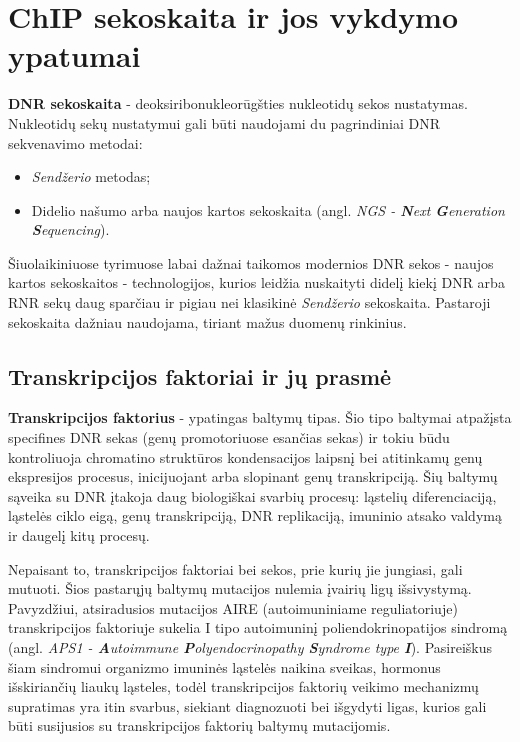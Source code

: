 \documentclass[12pt]{article}
\begin{document}
\section{ChIP sekoskaita ir jos vykdymo ypatumai}

\textbf{DNR sekoskaita} - deoksiribonukleorūgšties nukleotidų sekos nustatymas.
Nukleotidų sekų nustatymui gali būti naudojami du pagrindiniai DNR sekvenavimo 
metodai:

\begin{itemize}
    \item \emph{Sendžerio} metodas;
    \item Didelio našumo arba naujos kartos sekoskaita
    (angl. \emph{NGS - \textbf{N}ext \textbf{G}eneration \textbf{S}equencing}).
\end{itemize}

Šiuolaikiniuose tyrimuose labai dažnai taikomos modernios DNR sekos - naujos 
kartos se\-kos\-kai\-tos - technologijos, kurios leidžia nuskaityti didelį kiekį
DNR arba RNR sekų daug sparčiau ir pigiau nei klasikinė \emph{Sendžerio} 
sekoskaita. Pastaroji sekoskaita dažniau naudojama, tiriant mažus duomenų
rinkinius.

\subsection{Transkripcijos faktoriai ir jų prasmė}

\textbf{Transkripcijos faktorius} - ypatingas baltymų tipas. Šio tipo baltymai
atpažįsta specifines DNR sekas (genų promotoriuose esančias sekas) ir tokiu būdu
kontroliuoja chromatino struktūros kondensacijos laipsnį bei atitinkamų genų
ekspresijos procesus, inicijuojant arba slopinant genų transkripciją. Šių
baltymų sąveika su DNR įtakoja daug biologiškai svarbių procesų: ląstelių
diferenciaciją, ląstelės ciklo eigą, genų transkripciją, DNR replikaciją,
imuninio atsako valdymą ir daugelį kitų procesų\cite{ARTICLE10, ARTICLE11}.

Nepaisant to, transkripcijos faktoriai bei sekos, prie kurių jie jungiasi, gali
mutuoti. Šios pastarųjų baltymų mutacijos nulemia įvairių ligų išsivystymą.
Pavyzdžiui, atsiradusios mutacijos AIRE (autoimuniniame reguliatoriuje)
transkripcijos faktoriuje sukelia I tipo autoimuninį poliendokrinopatijos
sindromą\cite{ARTICLE9} (angl. \emph{APS1 - \textbf{A}utoimmune
\textbf{P}olyendocrinopathy \textbf{S}yndrome type \textbf{I}}). Pasireiškus
šiam sindromui organizmo imuninės ląstelės naikina sveikas, hormonus
išskiriančių liaukų ląsteles\cite{ASP1}, todėl transkripcijos faktorių veikimo
mechanizmų supratimas yra itin svarbus, siekiant diagnozuoti bei išgydyti ligas,
kurios gali būti susijusios su transkripcijos faktorių baltymų mutacijomis.
\end{document}
